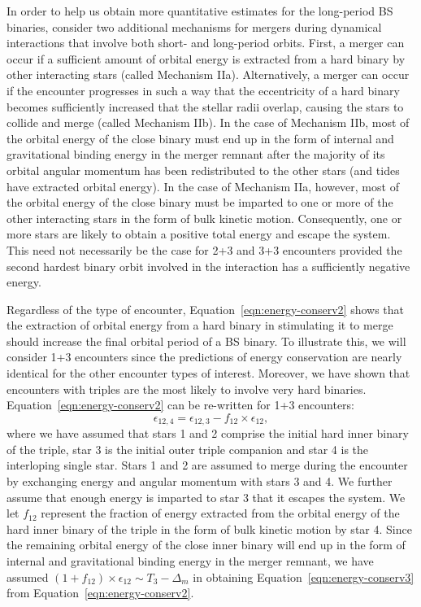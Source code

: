 \begin{enumerate}
In order to help us obtain more quantitative estimates for the
long-period BS binaries, consider two additional
mechanisms for mergers during dynamical interactions that involve both
short- and long-period orbits.  First, a
merger can occur if a sufficient amount of orbital energy is extracted
from a hard binary by other interacting stars (called Mechanism IIa).
Alternatively, a merger can occur if the encounter progresses in such
a way that the eccentricity of a hard binary becomes sufficiently
increased that the stellar radii overlap, causing the stars to
collide and merge (called Mechanism IIb).  In the case of Mechanism
IIb, most of the orbital energy of the close binary must end 
up in the form of internal and gravitational binding energy in the
merger remnant after the majority of its orbital angular momentum has been
redistributed to the other stars (and tides have extracted orbital
energy).  In the case of Mechanism IIa, however, most 
of the orbital energy of the close binary must be imparted to
one or more of the other interacting stars in the form of bulk kinetic
motion.  Consequently, one or more stars are likely to obtain a
positive total energy and escape the system.  This need not
necessarily be the case for 2+3 and 3+3 encounters provided the second
hardest binary orbit involved in the interaction has a sufficiently
negative energy.  

Regardless of the type of encounter,
Equation~\ref{eqn:energy-conserv2} shows that the extraction of
orbital energy from a hard binary in stimulating it to merge should 
increase the final orbital period of a BS binary.  To illustrate this,
we will consider 1+3 encounters since the predictions of energy
conservation are nearly identical for the other encounter types of 
interest.  Moreover, we have shown that encounters with triples
are the most likely to involve very hard binaries.
Equation~\ref{eqn:energy-conserv2} can be re-written for 1+3
encounters:  
\begin{equation}
\label{eqn:energy-conserv3}
\epsilon_{12,4} = \epsilon_{12,3} - f_{12} \times \epsilon_{12},
\end{equation}
where we have assumed that stars 1 and 2 comprise the initial hard
inner binary of the triple, star 3 is the initial outer triple
companion and star 4 is the interloping single star.  Stars 1 and 2
are assumed to merge during the encounter by exchanging energy and
angular momentum with stars 3 and 4.  We further assume that enough
energy is imparted to star 3 that it escapes the system.  We let $f_{12}$ 
represent the fraction of energy extracted from the orbital energy of
the hard inner binary of the triple in the form of bulk kinetic motion
by star 4.  Since the remaining orbital energy
of the close inner 
binary will end up in the form of internal and gravitational binding
energy in the merger remnant, we have assumed $(1 + f_{12}) \times
\epsilon_{12} \sim T_3 - \Delta_m$ in obtaining
Equation~\ref{eqn:energy-conserv3} from
Equation~\ref{eqn:energy-conserv2}.


\end{enumerate}
